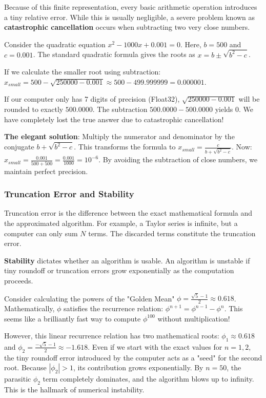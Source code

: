 \documentclass[12pt, a4paper]{article}
\begin{document}
Because of this finite representation, every basic arithmetic operation introduces a tiny relative error. While this is usually negligible, a severe problem known as \textbf{catastrophic cancellation} occurs when subtracting two very close numbers. 

\begin{tcolorbox}[colback=blue!5!white,colframe=blue!75!black,title=Pedagogical Example: The Quadratic Formula]
Consider the quadratic equation $x^2 - 1000x + 0.001 = 0$. Here, $b = 500$ and $c = 0.001$.
The standard quadratic formula gives the roots as $x = b \pm \sqrt{b^2 - c}$. 

If we calculate the smaller root using subtraction:
$x_{small} = 500 - \sqrt{250000 - 0.001} \approx 500 - 499.999999 = 0.000001$.

If our computer only has 7 digits of precision (Float32), $\sqrt{250000 - 0.001}$ will be rounded to exactly $500.0000$. The subtraction $500.0000 - 500.0000$ yields $0$. We have completely lost the true answer due to catastrophic cancellation!

\textbf{The elegant solution}: Multiply the numerator and denominator by the conjugate $b + \sqrt{b^2-c}$. This transforms the formula to $x_{small} = \frac{c}{b + \sqrt{b^2 - c}}$.
Now: $x_{small} = \frac{0.001}{500 + 500} = \frac{0.001}{1000} = 10^{-6}$.
By avoiding the subtraction of close numbers, we maintain perfect precision.
\end{tcolorbox}

\subsubsection{Truncation Error and Stability}
Truncation error is the difference between the exact mathematical formula and the approximated algorithm. For example, a Taylor series is infinite, but a computer can only sum $N$ terms. The discarded terms constitute the truncation error.

\textbf{Stability} dictates whether an algorithm is usable. An algorithm is unstable if tiny roundoff or truncation errors grow exponentially as the computation proceeds.

\begin{tcolorbox}[colback=red!5!white,colframe=red!75!black,title=Intuitive Analogy: The Golden Mean Recursion]
Consider calculating the powers of the "Golden Mean" $\phi = \frac{\sqrt{5}-1}{2} \approx 0.618$.
Mathematically, $\phi$ satisfies the recurrence relation: $\phi^{n+1} = \phi^{n-1} - \phi^n$.
This seems like a brilliantly fast way to compute $\phi^{100}$ without multiplication!

However, this linear recurrence relation has two mathematical roots: $\phi_1 \approx 0.618$ and $\phi_2 = \frac{-\sqrt{5}-1}{2} \approx -1.618$.
Even if we start with the exact values for $n=1, 2$, the tiny roundoff error introduced by the computer acts as a "seed" for the second root. Because $|\phi_2| > 1$, its contribution grows exponentially. By $n=50$, the parasitic $\phi_2$ term completely dominates, and the algorithm blows up to infinity. This is the hallmark of numerical instability.
\end{tcolorbox}
\end{document}
